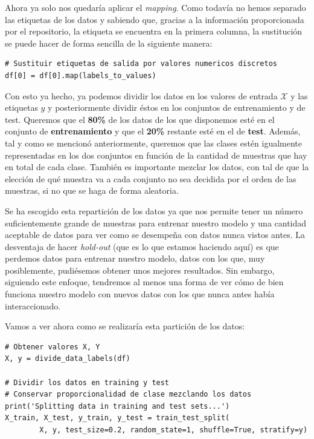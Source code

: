 \documentclass[11pt,a4paper]{article}
\begin{document}
Ahora ya solo nos quedaría aplicar el \textit{mapping}. Como todavía no hemos separado las etiquetas de los datos y sabiendo que, gracias
a la información proporcionada por el repositorio, la etiqueta se encuentra en la primera columna, la sustitución se puede hacer de forma
sencilla de la siguiente manera:

\begin{lstlisting}
# Sustituir etiquetas de salida por valores numericos discretos
df[0] = df[0].map(labels_to_values)
\end{lstlisting}

Con esto ya hecho, ya podemos dividir los datos en los valores de entrada $\mathcal{X}$ y las etiquetas $y$ y posteriormente dividir
éstos en los conjuntos de entrenamiento y de test. Queremos que el \textbf{80\%} de los datos de los que disponemos esté en el conjunto de
\textbf{entrenamiento} y que el \textbf{20\%} restante esté en el de \textbf{test}. Además, tal y como se mencionó anteriormente, queremos que las clases estén
igualmente representadas en los dos conjuntos en función de la cantidad de muestras que hay en total de cada clase. También es importante
mezclar los datos, con tal de que la elección de qué muestra va a cada conjunto no sea decidida por el orden de las muestras, si
no que se haga de forma aleatoria.

Se ha escogido esta repartición de los datos ya que nos permite tener un número suficientemente grande de muestras para entrenar nuestro
modelo y una cantidad aceptable de datos para ver como se desempeña con datos nunca vistos antes. La desventaja de hacer \textit{hold-out}
(que es lo que estamos haciendo aquí) es que perdemos datos para entrenar nuestro modelo, datos con los que, muy posiblemente, pudiésemos
obtener unos mejores resultados. Sin embargo, siguiendo este enfoque, tendremos al menos una forma de ver cómo de bien funciona nuestro
modelo con nuevos datos con los que nunca antes había interaccionado.

Vamos a ver ahora como se realizaría esta partición de los datos:

\begin{lstlisting}
# Obtener valores X, Y
X, y = divide_data_labels(df)

# Dividir los datos en training y test
# Conservar proporcionalidad de clase mezclando los datos
print('Splitting data in training and test sets...')
X_train, X_test, y_train, y_test = train_test_split(
        X, y, test_size=0.2, random_state=1, shuffle=True, stratify=y)
\end{lstlisting}
\end{document}

